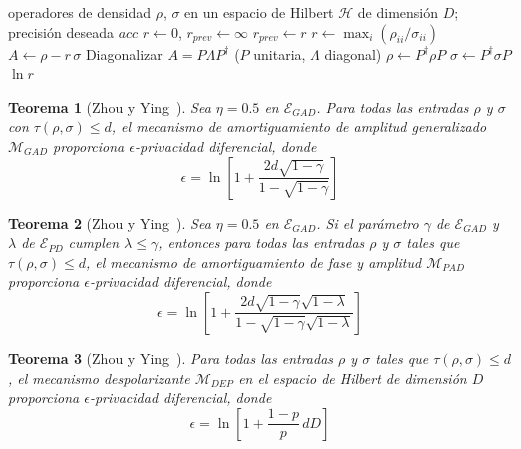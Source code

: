 \documentclass{ieeeaccess}
\newtheorem{theorem}{Teorema}[section]
\begin{document}
\begin{algorithm}[!t]
  \caption{Cálculo de $\mathrm{dPD}$ \cite{zhou2017differential}}
  \label{alg:dpd}
  \begin{algorithmic}[1]
    \REQUIRE operadores de densidad $\rho$, $\sigma$ en un espacio de Hilbert $\mathcal{H}$ de dimensión $D$; precisión deseada $\mathit{acc}$
    \STATE $r \gets 0$, $r_{prev} \gets \infty$
      \STATE $r_{prev} \gets r$
      \STATE $r \gets \max_i (\rho_{ii}/\sigma_{ii})$
      \STATE $A \gets \rho - r\,\sigma$
      \STATE Diagonalizar $A = P \Lambda P^{\dagger}$ ($P$ unitaria, $\Lambda$ diagonal)
      \STATE $\rho \gets P^{\dagger} \rho P$
      \STATE $\sigma \gets P^{\dagger} \sigma P$
    \ENDWHILE
    \RETURN $\ln r$
  \end{algorithmic}
\end{algorithm}

\begin{theorem}[Zhou y Ying~\cite{zhou2017differential}]
    Sea $\eta = 0.5$ en $\mathcal{E}_{GAD}$. Para todas las entradas $\rho$ y $\sigma$ con $\tau(\rho, \sigma) \leq d$, el mecanismo de amortiguamiento de amplitud generalizado $\mathcal{M}_{GAD}$ proporciona $\epsilon$-privacidad diferencial, donde
    \[
      \epsilon = \ln\left[1 + \frac{2d\sqrt{1-\gamma}}{1-\sqrt{1-\gamma}}\right]
    \]
    \label{thm:epsilon_gad}
\end{theorem}

\begin{theorem}[Zhou y Ying~\cite{zhou2017differential}]
    Sea $\eta = 0.5$ en $\mathcal{E}_{GAD}$. Si el parámetro $\gamma$ de $\mathcal{E}_{GAD}$ y $\lambda$ de $\mathcal{E}_{PD}$ cumplen $\lambda \leq \gamma$, entonces para todas las entradas $\rho$ y $\sigma$ tales que $\tau(\rho, \sigma) \leq d$, el mecanismo de amortiguamiento de fase y amplitud $\mathcal{M}_{PAD}$ proporciona $\epsilon$-privacidad diferencial, donde
    \[
      \epsilon = \ln\left[1 + \frac{2d\sqrt{1-\gamma}\sqrt{1-\lambda}}{1-\sqrt{1-\gamma}\sqrt{1-\lambda}}\right]
    \]
    \label{thm:epsilon_pad}
\end{theorem}

\begin{theorem}[Zhou y Ying~\cite{zhou2017differential}]
    Para todas las entradas $\rho$ y $\sigma$ tales que $\tau(\rho, \sigma) \leq d$, el mecanismo despolarizante $\mathcal{M}_{DEP}$ en el espacio de Hilbert de dimensión $D$ proporciona $\epsilon$-privacidad diferencial, donde
    \[
      \epsilon = \ln\left[1 + \frac{1-p}{p}\, dD\right]
    \]
    \label{thm:epsilon_dep}
\end{theorem}
\end{document}
